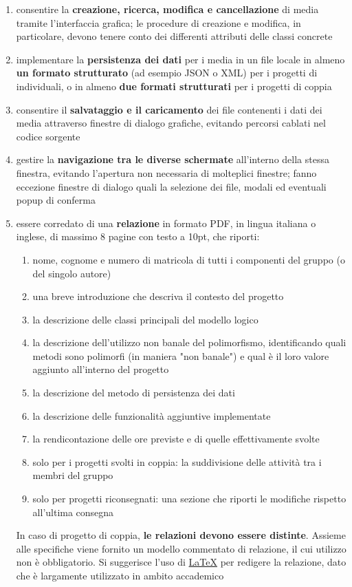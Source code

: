 \documentclass[10pt,a4paper,oneside]{article}
\begin{document}
\begin{enumerate}
 \item consentire la \textbf{creazione, ricerca, modifica e cancellazione} di media tramite l'interfaccia grafica; le procedure di creazione e modifica, in particolare, devono tenere conto dei differenti attributi delle classi concrete
 \item implementare la \textbf{persistenza dei dati} per i media in un file locale in almeno \textbf{un formato strutturato} (ad esempio JSON o XML) per i progetti di individuali, o in almeno \textbf{due formati strutturati} per i progetti di coppia
 \item consentire il \textbf{salvataggio e il caricamento} dei file contenenti i dati dei media attraverso finestre di dialogo grafiche, evitando percorsi cablati nel codice sorgente
 \item gestire la \textbf{navigazione tra le diverse schermate} all'interno della stessa finestra, evitando l'apertura non necessaria di molteplici finestre; fanno eccezione finestre di dialogo quali la selezione dei file, modali ed eventuali popup di conferma
 \item essere corredato di una \textbf{relazione} in formato PDF, in lingua italiana o inglese, di massimo 8 pagine con testo a 10pt, che riporti:
 \begin{enumerate}
  \item nome, cognome e numero di matricola di tutti i componenti del gruppo (o del singolo autore)
  \item una breve introduzione che descriva il contesto del progetto
  \item la descrizione delle classi principali del modello logico
  \item la descrizione dell'utilizzo non banale del polimorfismo, identificando quali metodi sono polimorfi (in maniera "non banale") e qual è il loro valore aggiunto all'interno del progetto
  \item la descrizione del metodo di persistenza dei dati
  \item la descrizione delle funzionalità aggiuntive implementate
  \item la rendicontazione delle ore previste e di quelle effettivamente svolte
  \item solo per i progetti svolti in coppia: la suddivisione delle attività tra i membri del gruppo
  \item solo per progetti riconsegnati: una sezione che riporti le modifiche rispetto all'ultima consegna
 \end{enumerate}
 In caso di progetto di coppia, \textbf{le relazioni devono essere distinte}. Assieme alle specifiche viene fornito un modello commentato di relazione, il cui utilizzo non è obbligatorio. Si suggerisce l'uso di \href{https://it.wikipedia.org/wiki/LaTeX}{LaTeX} per redigere la relazione, dato che è largamente utilizzato in ambito accademico
\end{enumerate}
\end{document}
